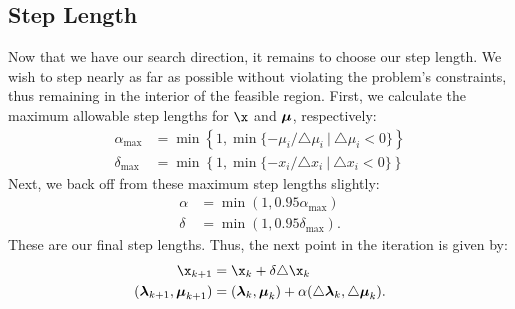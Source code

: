  %

\subsection*{Step Length}

Now that we have our search direction, it remains to choose our step length.
We wish to step nearly as far as possible without violating the problem's constraints, thus remaining in the interior of the feasible region.
First, we calculate the maximum allowable step lengths for $\x$ and $\boldsymbol{\mu}$, respectively:
\begin{align*}
\alpha_{\max} &= \min\left\{1, \min\{-\mu_i/\triangle \mu_i\ |\ \triangle \mu_i < 0 \}\right\}\\
\delta_{\max} &= \min\left\{1, \min\{-x_i/\triangle x_i\ |\ \triangle x_i < 0 \}\right\}
\end{align*}
Next, we back off from these maximum step lengths slightly:
\begin{align*}
\alpha &= \min(1, 0.95\alpha_{\max})\\
\delta &= \min(1, 0.95\delta_{\max}).
\end{align*}
These are our final step lengths.
Thus, the next point in the iteration is given by:
\begin{align*}
\x_{k+1} &= \x_k + \delta \triangle \x_k\\
(\Lamb_{k+1}, \Mu_{k+1}) &= (\Lamb_k, \Mu_k) + \alpha(\triangle \Lamb_k, \triangle \Mu_k).
\end{align*}

